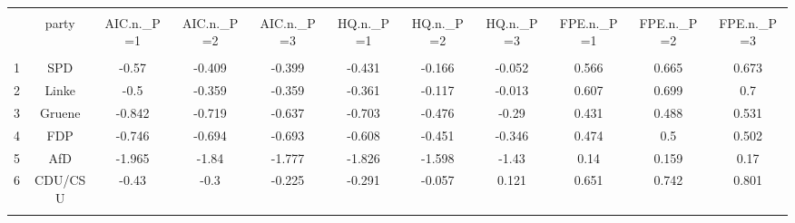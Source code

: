 \begin{table}[!htbp] \centering 
  \caption{} 
  \label{} 
\begin{tabular}{@{\extracolsep{5pt}} ccccccccccc} 
\\[-1.8ex]\hline 
\hline \\[-1.8ex] 
 & party & AIC.n.\_P=1 & AIC.n.\_P=2 & AIC.n.\_P=3 & HQ.n.\_P=1 & HQ.n.\_P=2 & HQ.n.\_P=3 & FPE.n.\_P=1 & FPE.n.\_P=2 & FPE.n.\_P=3 \\ 
\hline \\[-1.8ex] 
1 & SPD & -0.57 & -0.409 & -0.399 & -0.431 & -0.166 & -0.052 & 0.566 & 0.665 & 0.673 \\ 
2 & Linke & -0.5 & -0.359 & -0.359 & -0.361 & -0.117 & -0.013 & 0.607 & 0.699 & 0.7 \\ 
3 & Gruene & -0.842 & -0.719 & -0.637 & -0.703 & -0.476 & -0.29 & 0.431 & 0.488 & 0.531 \\ 
4 & FDP & -0.746 & -0.694 & -0.693 & -0.608 & -0.451 & -0.346 & 0.474 & 0.5 & 0.502 \\ 
5 & AfD & -1.965 & -1.84 & -1.777 & -1.826 & -1.598 & -1.43 & 0.14 & 0.159 & 0.17 \\ 
6 & CDU/CSU & -0.43 & -0.3 & -0.225 & -0.291 & -0.057 & 0.121 & 0.651 & 0.742 & 0.801 \\ 
\hline \\[-1.8ex] 
\end{tabular} 
\end{table}  
